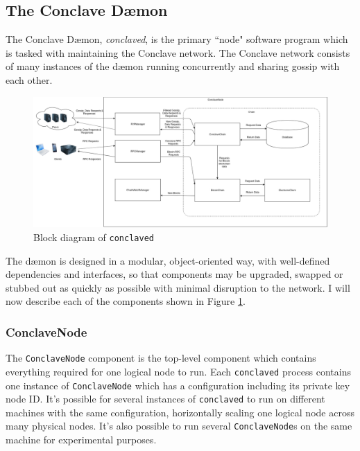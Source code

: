 \documentclass{report}
\begin{document}
		\subsection{The Conclave Dæmon}
			The Conclave Dæmon, \textit{conclaved}, is the primary ``node" software program which is tasked with maintaining the Conclave network. The Conclave network consists of many instances of the dæmon running concurrently and sharing gossip with each other. \\

			\begin{figure}[H]
				\begin{center}
				\includegraphics[width=400pt]{img/conclaved.png}
				\end{center}
				\caption{Block diagram of \texttt{conclaved}}
				\label{fig:conclavedBlockDiagram}
			\end{figure}
			
			The dæmon is designed in a modular, object-oriented way, with well-defined dependencies and interfaces, so that components may be upgraded, swapped or stubbed out as quickly as possible with minimal disruption to the network. I will now describe each of the components shown in Figure \ref{fig:conclavedBlockDiagram}.
			\subsubsection{ConclaveNode}
			The \texttt{ConclaveNode} component is the top-level component which contains everything required for one logical node to run. Each \texttt{conclaved} process contains one instance of \texttt{ConclaveNode} which has a configuration including its private key node ID. It's possible for several instances of \texttt{conclaved} to run on different machines with the same configuration, horizontally scaling one logical node across many physical nodes. It's also possible to run several \texttt{ConclaveNode}s on the same machine for experimental purposes. 
\end{document}
